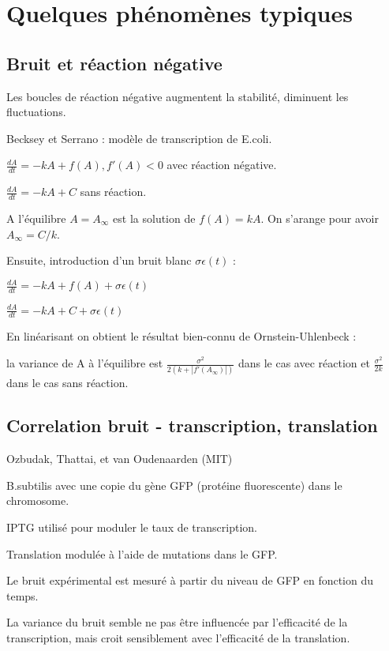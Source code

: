 \documentclass{article}
\def\magenta{\color{goldenrod}}
\begin{document}
\chapter{\magenta \textsf{\Huge Quelques ph{\'e}nom{\`e}nes typiques }}


\section{\magenta \textsf{\Large Bruit et r{\'e}action n{\'e}gative }}

Les boucles de r{\'e}action n{\'e}gative augmentent la stabilit{\'e}, diminuent les fluctuations.


Becksey et Serrano : mod{\`e}le de transcription de E.coli.

$\frac{dA}{dt} = -kA + f(A), f'(A) <0$  avec r{\'e}action n{\'e}gative.

$\frac{dA}{dt} = -kA + C $ sans r{\'e}action.


A l'{\'e}quilibre $A=A_{\infty}$ est la solution de $f(A)=kA$. On s'arange
pour avoir  $A_{\infty}=C/k$.


Ensuite, introduction d'un bruit blanc $\sigma \epsilon (t)$ :

$\frac{dA}{dt} = -kA + f(A) + \sigma  \epsilon (t) $

$\frac{dA}{dt} = -kA + C + \sigma \epsilon (t) $

En lin{\'e}arisant on obtient le r{\'e}sultat bien-connu de Ornstein-Uhlenbeck :


la variance de A {\`a} l'{\'e}quilibre est
$\frac{\sigma^2}{2 (k+|f'(A_{\infty})|) }$ dans le cas avec r{\'e}action et
$\frac{\sigma^2}{2 k }$ dans le cas sans r{\'e}action.


\section{\magenta \textsf{\Large Correlation bruit - transcription, translation }}

Ozbudak, Thattai, et van Oudenaarden (MIT)

B.subtilis avec une copie du g{\`e}ne GFP (prot{\'e}ine fluorescente) dans le chromosome.

IPTG utilis{\'e} pour moduler le taux de transcription.

Translation modul{\'e}e {\`a} l'aide de mutations dans le GFP.

Le bruit exp{\'e}rimental est mesur{\'e} {\`a} partir du niveau de GFP en fonction
du temps.

La variance du bruit semble ne pas {\^e}tre influenc{\'e}e par l'efficacit{\'e} de la
transcription, mais croit sensiblement avec l'efficacit{\'e} de la
translation.
\end{document}
